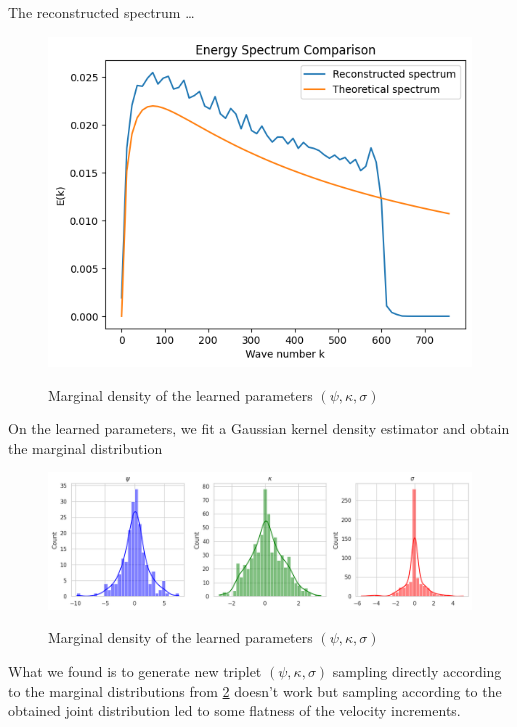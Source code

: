 \documentclass[a4paper,12pt]{article}
\theoremstyle{definition}
\begin{document}
The reconstructed spectrum \ldots

\begin{figure}[H]
    \centering
    \includegraphics[width=0.6\linewidth]{VelIncrPSIKAPPASIGMA/EnergySpectrum.png}
    \label{fig:EnergySpectrum3}
    \caption{Marginal density of the learned parameters $(\psi,\kappa,\sigma)$}
\end{figure}

On the learned parameters, we fit a Gaussian kernel density estimator and obtain the marginal distribution

\begin{figure}[H]
    \centering
    \includegraphics[width=\linewidth]{VelIncrPSIKAPPASIGMA/Distributions.png}
    \label{fig:Distributions3}
    \caption{Marginal density of the learned parameters $(\psi,\kappa,\sigma)$}
    \label{MarginalsPsiKappaSigma}
\end{figure}

What we found is to generate new triplet $(\psi,\kappa,\sigma)$ sampling directly according to the marginal distributions from \ref{MarginalsPsiKappaSigma} doesn't work but sampling according to the obtained joint distribution led to some flatness of the velocity increments.
\end{document}
